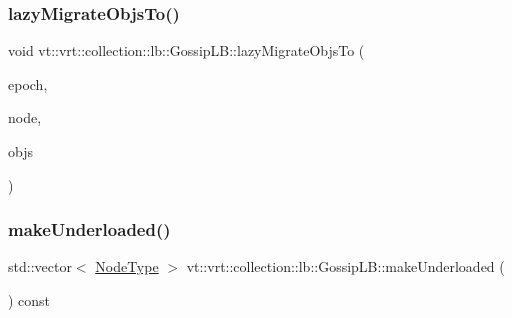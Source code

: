 \subsubsection{\texorpdfstring{lazy\+Migrate\+Objs\+To()}{lazyMigrateObjsTo()}}
{\footnotesize\ttfamily void vt\+::vrt\+::collection\+::lb\+::\+Gossip\+L\+B\+::lazy\+Migrate\+Objs\+To (\begin{DoxyParamCaption}\item[{\hyperlink{namespacevt_a985a5adf291c34a3ca263b3378388236}{Epoch\+Type}}]{epoch,  }\item[{\hyperlink{namespacevt_a866da9d0efc19c0a1ce79e9e492f47e2}{Node\+Type}}]{node,  }\item[{\hyperlink{structvt_1_1vrt_1_1collection_1_1lb_1_1_gossip_l_b_ad2093cf08cc6af0f3deb4441e40c55a9}{Objs\+Type} const \&}]{objs }\end{DoxyParamCaption})\hspace{0.3cm}{\ttfamily [protected]}}

\mbox{\label{structvt_1_1vrt_1_1collection_1_1lb_1_1_gossip_l_b_a244326d030b7b9b82328d2ce617fef43}} 
\subsubsection{\texorpdfstring{make\+Underloaded()}{makeUnderloaded()}}
{\footnotesize\ttfamily std\+::vector$<$ \hyperlink{namespacevt_a866da9d0efc19c0a1ce79e9e492f47e2}{Node\+Type} $>$ vt\+::vrt\+::collection\+::lb\+::\+Gossip\+L\+B\+::make\+Underloaded (\begin{DoxyParamCaption}{ }\end{DoxyParamCaption}) const\hspace{0.3cm}{\ttfamily [protected]}}

\mbox{\label{structvt_1_1vrt_1_1collection_1_1lb_1_1_gossip_l_b_ab4ea54ee62ebad9105d79ece61f41b50}} 
